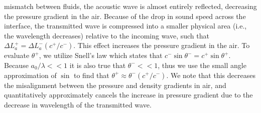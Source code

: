 mismatch between fluids, the acoustic wave is almost entirely
reflected, decreasing the pressure gradient in the air. Because of the
drop in sound speed across the interface, the transmitted wave is
compressed into a smaller physical area (i.e., the wavelength
decreases) relative to the incoming wave, such that
$\Delta L_a^+=\Delta L_a^- (c^+/c^-)$. This effect increases the
pressure gradient in the air. To evaluate $\theta^+$, we utilize
Snell's law which states that
$c^-\sin{\theta^-}=c^+\sin{\theta^+}$. Because $a_0/\lambda<<1$ it is
also true that $\theta^-<<1$, thus we use the small angle
approximation of $\sin$ to find that
$\theta^+\approx\theta^-(c^+/c^-)$. We note that this decreases the
misalignment between the pressure and density gradients in air, and
quantitatively approximately cancels the increase in pressure gradient
due to the decrease in wavelength of the transmitted wave.

